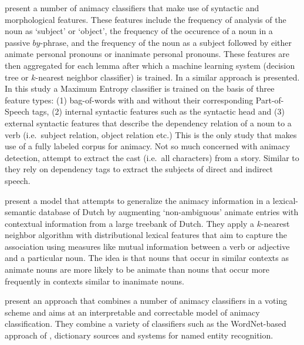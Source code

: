 \documentclass[a4paper,UKenglish]{oasics}
\begin{document}
\cite{ovrelid:04,ovrelid:05,ovrelid:06,ovrelid:08,ovrelid:09} present
a number of animacy classifiers that make use of syntactic and
morphological features. These features include the frequency of
analysis of the noun as `subject' or `object', the frequency of the
occurence of a noun in a passive $by$-phrase, and the frequency of the
noun as a subject followed by either animate personal pronouns or
inanimate personal pronouns. These features are then aggregated for
each lemma after which a machine learning system (decision tree or
$k$-nearest neighbor classifier) is trained. In \cite{bowman:12} a
similar approach is presented. In this study a Maximum Entropy
classifier is trained on the basis of three feature types: (1)
bag-of-words with and without their corresponding Part-of-Speech tags,
(2) internal syntactic features such as the syntactic head and (3)
external syntactic features that describe the dependency relation of a
noun to a verb (i.e.\ subject relation, object relation etc.)  This is
the only study that makes use of a fully labeled corpus for animacy.
Not so much concerned with animacy detection, \cite{karsdorp:12}
attempt to extract the cast (i.e.\ all characters) from a
story. Similar to \cite{bowman:12} they rely on dependency tags to
extract the subjects of direct and indirect speech.

\cite{bloem:13} present a model that attempts to generalize the
animacy information in a lexical-semantic database of Dutch by
augmenting `non-ambiguous' animate entries with contextual information
from a large treebank of Dutch. They apply a $k$-nearest neighbor
algorithm with distributional lexical features that aim to capture the
association using measures like mutual information between a verb or
adjective and a particular noun. The idea is that nouns that occur in
similar contexts as animate nouns are more likely to be animate than
nouns that occur more frequently in contexts similar to inanimate nouns.

\cite{moore:13} present an approach that combines a number of animacy
classifiers in a voting scheme and aims at an interpretable and
correctable model of animacy classification. They combine a variety of
classifiers such as the WordNet-based approach of \cite{evans:00},
dictionary sources and systems for named entity recognition.
\end{document}
